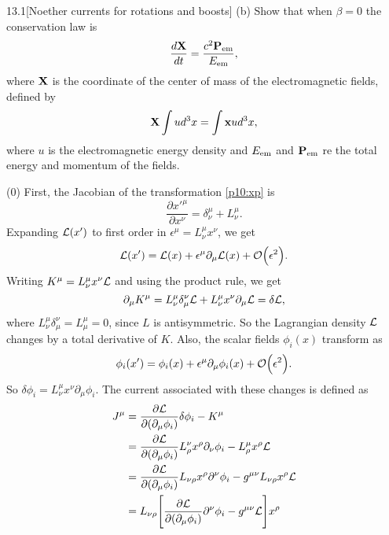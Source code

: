 \documentclass[12pt]{article}
\begin{document}
\begin{problem}{13.1}[Noether currents for rotations and boosts]
(b) Show that when $\beta=0$ the conservation law is
\begin{equation}
    \frac{d\vb{X}}{dt}=\frac{c^2\vb{P}_{\text{em}}}{E_{\text{em}}}, 
\end{equation}
where $\vb{X}$ is the coordinate of the center of mass of the electromagnetic
fields, defined by
\begin{equation}
    \vb{X}\int ud^3x=\int \vb{x}ud^3x ,
\end{equation}
where $u$ is the electromagnetic energy density and $E_{\text{em}}$ and
$\vb{P}_{\text{em}}$ re the total energy and momentum of the fields.
\begin{solution}
(0) First, the Jacobian of the transformation \eqref{p10:xp} is
\begin{equation}
    \frac{\partial x'^\mu}{\partial x^\nu}
    =\delta^\mu_\nu+L_\nu^\mu.
\end{equation}
Expanding $\mathcal{L}(x')$ to first order in $\epsilon^\mu=L_\nu^\mu x^\nu$, we get
\begin{equation}
    \LL(x')=\LL(x)+\epsilon^\mu\partial_\mu \LL(x)+\order{\epsilon^2}. 
\end{equation}
Writing $K^\mu=L_\nu^\mu x^\nu\mathcal{L}$ and using the product rule, we 
get
\begin{equation}
    \partial_\mu K^\mu=L_\nu^\mu \delta^\nu_\mu\mathcal{L}+L_\nu^\mu
    x^\nu\partial_\mu\mathcal{L}
    =\delta\mathcal{L},
\end{equation}
where $L_\nu^\mu \delta_\mu^\nu=L_\mu^\mu=0$, since $L$ is antisymmetric. So the
Lagrangian density $\mathcal{L}$ changes by a total derivative of $K$. Also, the scalar
fields $\phi_i(x)$ transform as
\begin{equation}
    \phi_i(x')=\phi_i(x)+\epsilon^\mu\partial_\mu\phi_i(x)+\order{\epsilon^2}.
\end{equation}
So $\delta\phi_i=L_\nu^\mu x^\nu\partial_\mu\phi_i$. The current associated with
these changes is defined as
\begin{align}
    J^\mu
    &=\frac{\partial\LL}{\partial(\partial_\mu\phi_i)}\delta\phi_i-K^\mu\notag\\
    &=\frac{\partial\LL}{\partial(\partial_\mu\phi_i)}L_\rho^\nu
    x^\rho\partial_\nu \phi_i-L_\rho^\mu x^\rho\LL\notag\\
    &=\frac{\partial\LL}{\partial(\partial_\mu\phi_i)}L_{\nu\rho}x^\rho\partial^\nu\phi_i-g^{\mu\nu}L_{\nu\rho}x^\rho\LL\notag\\
    &=L_{\nu\rho}\qty[\frac{\partial\LL}{\partial(\partial_\mu\phi_i)}\partial^\nu\phi_i-g^{\mu\nu}\LL]x^\rho\notag\\

\end{align}
\end{solution}
\end{problem}
\end{document}
